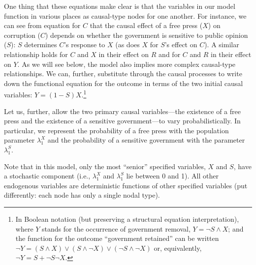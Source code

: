\documentclass[
  12pt,
]{book}
\begin{document}
One thing that these equations make clear is that the variables in our model function in various places as causal-type nodes for one another. For instance, we can see from equation for \(C\) that the causal effect of a free press (\(X\)) on corruption (\(C\)) depends on whether the government is sensitive to public opinion (\(S\)): \(S\) determines \(C\)'s response to \(X\) (as does \(X\) for \(S\)'s effect on \(C\)). A similar relationship holds for \(C\) and \(X\) in their effect on \(R\) and for \(C\) and \(R\) in their effect on \(Y\). As we will see below, the model also implies more complex causal-type relationships. We can, further, substitute through the causal processes to write down the functional equation for the outcome in terms of the two initial causal variables: \(Y=(1-S)X\).\footnote{In Boolean notation (but preserving a structural equation interpretation), where \(Y\) stands for the occurrence of government removal, \(Y= \neg S \land X\); and the function for the outcome ``government retained'' can be written \(\neg Y = (S\land X) \lor (S\land\neg X) \lor (\neg S \land \neg X)\) or, equivalently, \(\neg Y = S + \neg S \neg X\).}

Let us, further, allow the two primary causal variables---the existence of a free press and the existence of a sensitive government---to vary probabilistically. In particular, we represent the probability of a free press with the population parameter \(\lambda^X_1\) and the probability of a sensitive government with the parameter \(\lambda^S_1\).

Note that in this model, only the most ``senior'' specified variables, \(X\) and \(S\), have a stochastic component (i.e., \(\lambda^X_1\) and \(\lambda^S_1\) lie between 0 and 1). All other endogenous variables are deterministic functions of other specified variables (put differently: each node has only a single nodal type).
\end{document}

